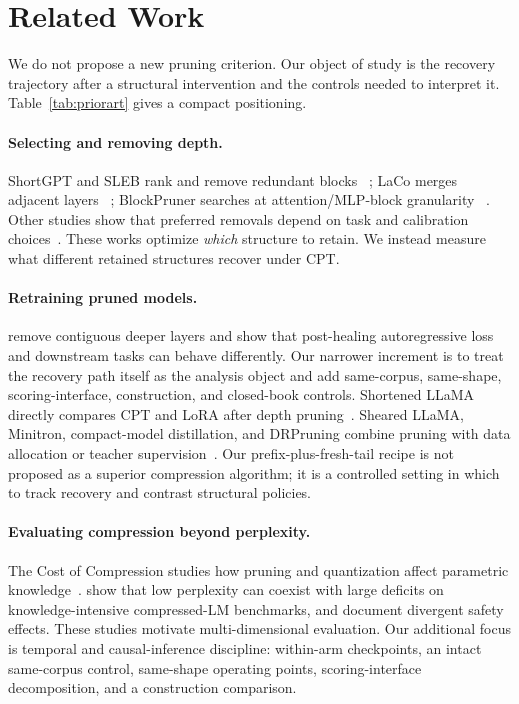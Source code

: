 \section{Related Work}
\label{sec:related}

We do not propose a new pruning criterion. Our object of study is the recovery
trajectory after a structural intervention and the controls needed to interpret
it. Table~\ref{tab:priorart} gives a compact positioning.



\paragraph{Selecting and removing depth.}
ShortGPT and SLEB rank and remove redundant blocks
~\citep{men2024shortgpt,song2024sleb}; LaCo merges adjacent layers
~\citep{yang2024laco}; BlockPruner searches at attention/MLP-block granularity
~\citep{blockpruner}. Other studies show that preferred removals depend on task
and calibration choices~\citep{siddiqui2024deeper,lu2024reassessing,
calibration2026}. These works optimize \emph{which} structure to retain. We
instead measure what different retained structures recover under CPT.

\paragraph{Retraining pruned models.}
\citet{gromov2024unreasonable} remove contiguous deeper layers and show that
post-healing autoregressive loss and downstream tasks can behave differently.
Our narrower increment is to treat the recovery path itself as the analysis
object and add same-corpus, same-shape, scoring-interface, construction, and
closed-book controls. Shortened LLaMA directly
compares CPT and LoRA after depth pruning~\citep{shortenedllama}. Sheared LLaMA,
Minitron, compact-model distillation, and DRPruning combine pruning with data
allocation or teacher supervision~\citep{xia2024sheared,minitron,
muralidharan2024compact,deng2025drpruning}. Our prefix-plus-fresh-tail recipe is
not proposed as a superior compression algorithm; it is a controlled setting in
which to track recovery and contrast structural policies.

\paragraph{Evaluating compression beyond perplexity.}
The Cost of Compression studies how pruning and quantization affect parametric
knowledge~\citep{costcompression}. \citet{jaiswal2024truth} show that low
perplexity can coexist with large deficits on knowledge-intensive compressed-LM
benchmarks, and \citet{beyondperplexity} document divergent safety effects.
These studies motivate multi-dimensional evaluation. Our additional focus is
temporal and causal-inference discipline: within-arm checkpoints, an intact
same-corpus control, same-shape operating points, scoring-interface
decomposition, and a construction comparison.

